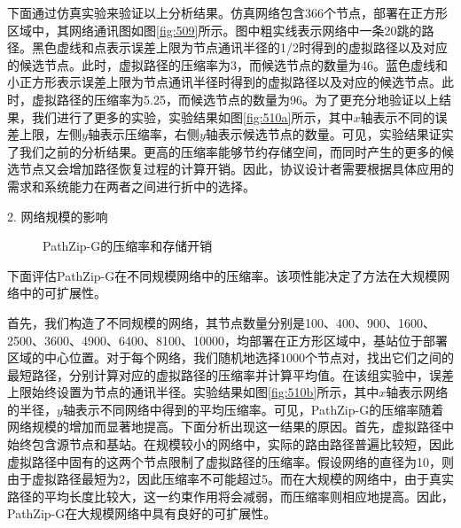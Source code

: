 下面通过仿真实验来验证以上分析结果。仿真网络包含366个节点，部署在正方形区域中，其网络通讯图如图\ref{fig:509}所示。图中粗实线表示网络中一条20跳的路径。黑色虚线和点表示误差上限为节点通讯半径的1/2时得到的虚拟路径以及对应的候选节点。此时，虚拟路径的压缩率为3，而候选节点的数量为46。蓝色虚线和小正方形表示误差上限为节点通讯半径时得到的虚拟路径以及对应的候选节点。此时，虚拟路径的压缩率为5.25，而候选节点的数量为96。为了更充分地验证以上结果，我们进行了更多的实验，实验结果如图\ref{fig:510a}所示，其中$x$轴表示不同的误差上限，左侧$y$轴表示压缩率，右侧$y$轴表示候选节点的数量。可见，实验结果证实了我们之前的分析结果。更高的压缩率能够节约存储空间，而同时产生的更多的候选节点又会增加路径恢复过程的计算开销。因此，协议设计者需要根据具体应用的需求和系统能力在两者之间进行折中的选择。

2. 网络规模的影响

\begin{figure}[t]
  \centering
  \hspace{0.5em}
  \hspace{0.5em}
  \hspace{0.5em}
  \hspace{0.5em}
  \hspace{0.5em}
  \caption{PathZip-G的压缩率和存储开销}
  \label{fig:510}
\end{figure}
下面评估PathZip-G在不同规模网络中的压缩率。该项性能决定了方法在大规模网络中的可扩展性。

首先，我们构造了不同规模的网络，其节点数量分别是100、400、900、1600、2500、3600、4900、6400、8100、10000，均部署在正方形区域中，基站位于部署区域的中心位置。对于每个网络，我们随机地选择1000个节点对，找出它们之间的最短路径，分别计算对应的虚拟路径的压缩率并计算平均值。在该组实验中，误差上限始终设置为节点的通讯半径。实验结果如图\ref{fig:510b}所示，其中$x$轴表示网络的半径，$y$轴表示不同网络中得到的平均压缩率。可见，PathZip-G的压缩率随着网络规模的增加而显著地提高。下面分析出现这一结果的原因。首先，虚拟路径中始终包含源节点和基站。在规模较小的网络中，实际的路由路径普遍比较短，因此虚拟路径中固有的这两个节点限制了虚拟路径的压缩率。假设网络的直径为10，则由于虚拟路径最短为2，因此压缩率不可能超过5。而在大规模的网络中，由于真实路径的平均长度比较大，这一约束作用将会减弱，而压缩率则相应地提高。因此，PathZip-G在大规模网络中具有良好的可扩展性。

